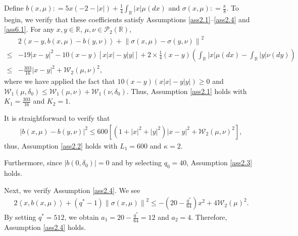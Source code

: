 \documentclass[12pt]{article}
\numberwithin{equation}{section}
\begin{document}
Define
$b\left( x,\mu \right): =5x\left( -2-\left|x\right| \right) +\tfrac{1}{4}\int_{\mathbb{R}}{\left|x\right|}\mu \left( dx \right) $ and $\sigma\left( x,\mu \right): =\tfrac{x}{8}$.  
To begin, we verify that these coefficients satisfy Assumptions \ref{ass2.1}--\ref{ass2.4} and \ref{ass6.1}.  For any $x,y\in \mathbb{R}$, $\mu ,\nu \in \mathcal{P} _2\left( \mathbb{R} \right)$,
\begin{equation}\tag{4.3}\label{7.3}
\begin{aligned}
&2\left\langle x-y,b\left(x,\mu \right)-b\left(y,\nu \right)\right\rangle +\left\| \sigma\left (x,\mu \right)-\sigma \left(y,\nu \right)\right\| ^2\\
\leq& -19\left|x-y\right|^2-10\left( x-y \right) \left[ x\left|x\right|-y\left|y\right| \right] +2\times \tfrac{1}{4}\left( x-y \right) \left( \int_{\mathbb{R}}{\left|x\right|}\mu \left( dx \right) -\int_{\mathbb{R}}{\left|y\right|}\nu \left( dy \right) \right)\\
\leq& -\tfrac{303}{16}\left|x-y\right|^2+\mathcal{W}_2\left( \mu ,\nu \right) ^2
,
\end{aligned}
\end{equation}
where we have applied the fact that $10\left( x-y \right) \left( x\left|x\right|-y\left|y\right| \right) \geq 0$ and $\mathcal{W}_1\left( \mu ,\delta _0 \right) \leq \mathcal{W}_1\left( \mu ,\nu \right) +\mathcal{W}_1\left( \nu ,\delta _0 \right) $.
Thus, Assumption \ref{ass2.1} holds with $K_1=\tfrac{303}{16}$ and $K_2=1$.

It is straightforward to verify that 
\begin{equation}\tag{4.4}\label{7.4}
\begin{aligned}
\left|b\left( x,\mu \right) -b\left( y,\nu \right) \right|^2\leq 600\left[ \left( 1+\left|x\right|^2+\left|y\right|^2 \right) \left|x-y\right|^2+\mathcal{W}_2\left( \mu ,\nu \right) ^2 \right] ,
\end{aligned}
\end{equation}
thus, Assumption \ref{ass2.2}  holds with $L_1=600$ and $\kappa=2$.

Furthermore, since $\left| b\left( 0,\delta _0 \right) \right|=0$ and by selecting $q_{0}=40$, Assumption \ref{ass2.3} holds.

Next, we verify Assumption  \ref{ass2.4}. We see 
\begin{equation}\tag{4.5}\label{7.5}
\begin{aligned}
2\left\langle x,b\left(x,\mu \right)\right\rangle +\left(q^*-1\right)\left\| \sigma \left(x,\mu \right)\right\| ^2
\leq -\left( 20-\tfrac{q^*}{64} \right) x^2+4\mathcal{W}_2\left( \mu \right) ^2.
\end{aligned}
\end{equation}
By setting $q^*=512$, we obtain $a_1= 20-\frac{q^*}{64}=12$ and $a_2=4$. Therefore,  Assumption \ref{ass2.4} holds.
\end{document}

